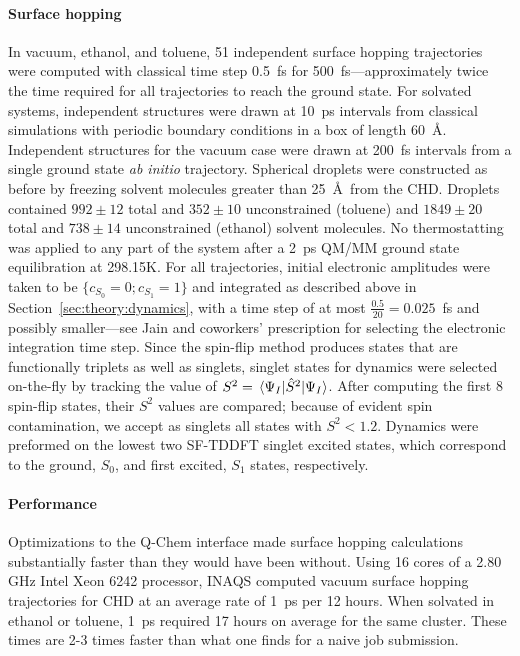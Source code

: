 \documentclass[journal=jctcce,manuscript=article,layout=traditional]{achemso}
\begin{document}
\paragraph{Surface hopping}
In vacuum, ethanol, and toluene, 51 independent surface hopping trajectories were computed with classical time step 0.5~fs for 500~fs---approximately twice the time required for all trajectories to reach the ground state.
For solvated systems, independent structures were drawn at 10~ps intervals from classical simulations with periodic boundary conditions in a box of length 60~\AA.
Independent structures for the vacuum case were drawn at 200~fs intervals from a single ground state \emph{ab initio} trajectory.
Spherical droplets were constructed as before by freezing solvent molecules greater than 25~\AA\ from the CHD. Droplets contained $992\pm12$ total and $352\pm10$ unconstrained (toluene) and $1849\pm20$ total and $738\pm14$ unconstrained (ethanol) solvent molecules.
No thermostatting was applied to any part of the system after a 2~ps QM/MM ground state equilibration at 298.15K.
For all trajectories, initial electronic amplitudes were taken to be $\{c_{S_0} = 0; c_{S_1} = 1\}$ and integrated as described above in Section~\ref{sec:theory:dynamics}, with a time step of at most $\frac{0.5}{20}=0.025$~fs and possibly smaller---see Jain and coworkers' prescription for selecting the electronic integration time step\cite{jain2016:afssh}.
Since the spin-flip method produces states that are functionally triplets as well as singlets, singlet states for dynamics were selected on-the-fly by tracking the value of $S^2  = \ev{\hat{S}^2}{\Psi_I}$. \cite{minezawa:gordon:2009:spinflip,herbert:2015:spinflip}
After computing the first 8 spin-flip states, their $S^2$ values are compared; because of evident spin contamination, we accept as singlets all states with $S^2 < 1.2$.
Dynamics were preformed on the lowest two SF-TDDFT singlet excited states, which correspond to the ground, $S_0$, and first excited, $S_1$ states, respectively. 

\paragraph{Performance}
Optimizations to the Q-Chem interface made surface hopping calculations substantially faster than they would have been without.
Using 16 cores of a 2.80 GHz Intel Xeon 6242  processor, INAQS computed vacuum surface hopping trajectories for CHD at an average rate of 1~ps per 12 hours.
When solvated in ethanol or toluene, 1~ps required 17 hours on average for the same cluster.
These times are 2-3 times faster than what one finds for a naive job submission.
\end{document}

